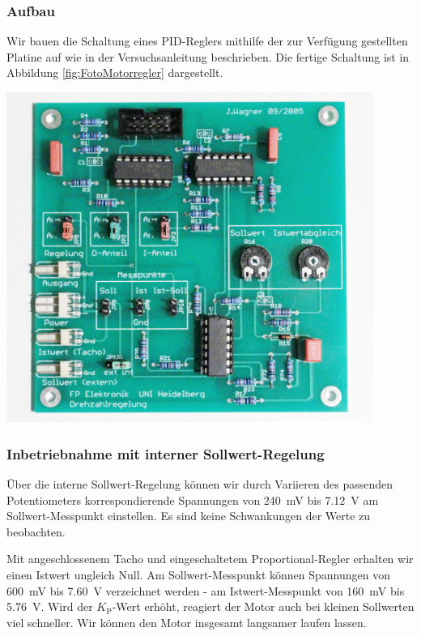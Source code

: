 \subsubsection*{Aufbau}
%
Wir bauen die Schaltung eines PID-Reglers mithilfe der zur Verfügung gestellten Platine auf wie in der Versuchsanleitung \cite{Anleitung} beschrieben.
Die fertige Schaltung ist in Abbildung \ref{fig:FotoMotorregler} dargestellt.
%
\minipage{\linewidth}
    \begin{center}
        \captionsetup{type=figure}
        \begin{adjustbox}{max width=\linewidth, keepaspectratio}
            \includegraphics[width=120mm]{jpg/FotoMotorregler}
        \end{adjustbox}
        \label{fig:FotoMotorregler}
    \end{center}
\endminipage
%
\subsubsection*{Inbetriebnahme mit interner Sollwert-Regelung}
%
Über die interne Sollwert-Regelung können wir durch Variieren des passenden Potentiometers korrespondierende Spannungen von \SI{240}{\milli\volt} bis \SI{7,12}{\volt} am Sollwert-Messpunkt einstellen.
Es sind keine Schwankungen der Werte zu beobachten.
%
\par
%
Mit angeschlossenem Tacho und eingeschaltetem Proportional-Regler erhalten wir einen Istwert ungleich Null.
Am Sollwert-Messpunkt können Spannungen von \SI{600}{\milli\volt} bis \SI{7,60}{\volt} verzeichnet werden - am Istwert-Messpunkt von \SI{160}{\milli\volt} bis \SI{5,76}{\volt}.
Wird der $K_{\text{P}}$-Wert erhöht, reagiert der Motor auch bei kleinen Sollwerten viel schneller.
Wir können den Motor insgesamt langsamer laufen lassen.
%
